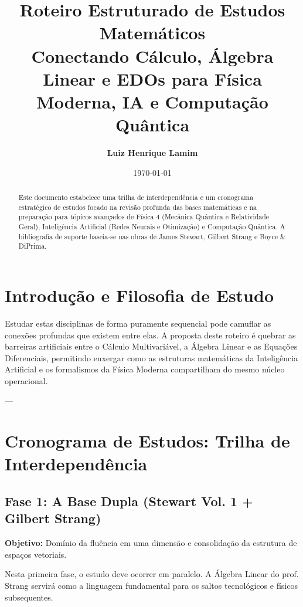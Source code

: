 \documentclass[11pt,a4paper]{article}
\title{\Huge \textbf{Roteiro Estruturado de Estudos Matemáticos}\\ \vspace{0.3cm} \large Conectando Cálculo, Álgebra Linear e EDOs para Física Moderna, IA e Computação Quântica}
\author{\textbf{Luiz Henrique Lamim}}
\date{\today}
\begin{document}
\maketitle

\begin{abstract}
Este documento estabelece uma trilha de interdependência e um cronograma estratégico de estudos focado na revisão profunda das bases matemáticas e na preparação para tópicos avançados de Física 4 (Mecânica Quântica e Relatividade Geral), Inteligência Artificial (Redes Neurais e Otimização) e Computação Quântica. A bibliografia de suporte baseia-se nas obras de James Stewart, Gilbert Strang e Boyce \& DiPrima.
\end{abstract}

\vspace{0.5cm}

\section{Introdução e Filosofia de Estudo}
Estudar estas disciplinas de forma puramente sequencial pode camuflar as conexões profundas que existem entre elas. A proposta deste roteiro é quebrar as barreiras artificiais entre o Cálculo Multivariável, a Álgebra Linear e as Equações Diferenciais, permitindo enxergar como as estruturas matemáticas da Inteligência Artificial e os formalismos da Física Moderna compartilham do mesmo núcleo operacional.

---

\section{Cronograma de Estudos: Trilha de Interdependência}

\subsection{Fase 1: A Base Dupla (Stewart Vol. 1 + Gilbert Strang)}
\textbf{Objetivo:} Domínio da fluência em uma dimensão e consolidação da estrutura de espaços vetoriais.

Nesta primeira fase, o estudo deve ocorrer em paralelo. A Álgebra Linear do prof. Strang servirá como a linguagem fundamental para os saltos tecnológicos e físicos subsequentes.
\end{document}
